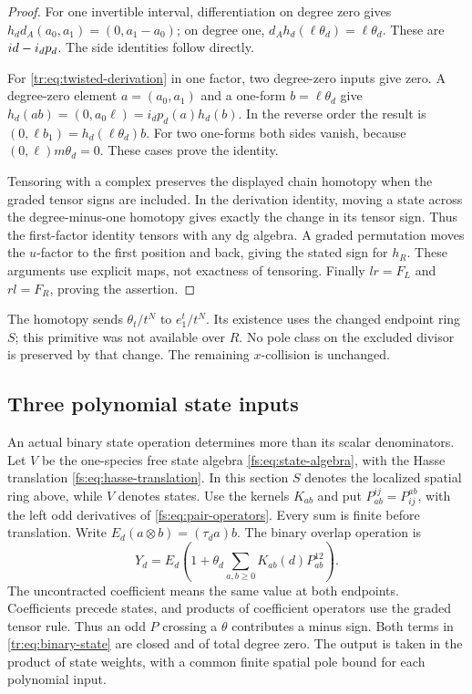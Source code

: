 \begin{proof}
For one invertible interval, differentiation on degree zero gives
\(h_dd_A(a_0,a_1)=(0,a_1-a_0)\); on degree one,
\(d_Ah_d(\ell\theta_d)=\ell\theta_d\).  These are
\(id-i_dp_d\).  The side identities follow directly.

For \eqref{tr:eq:twisted-derivation} in one factor, two degree-zero
inputs give zero.  A degree-zero element \(a=(a_0,a_1)\)
and a one-form \(b=\ell\theta_d\) give
\(h_d(ab)=(0,a_0\ell)=i_dp_d(a)h_d(b)\).
In the reverse order the result is
\((0,\ell b_1)=h_d(\ell\theta_d)b\).
For two one-forms both sides vanish, because
\((0,\ell)m\theta_d=0\).  These cases prove the identity.

Tensoring with a complex preserves the displayed chain homotopy
when the graded tensor signs are included.  In the derivation
identity, moving a state across the degree-minus-one homotopy gives
exactly the change in its tensor sign.  Thus the first-factor
identity tensors with any dg algebra.  A graded permutation moves
the \(u\)-factor to the first position and back, giving the
stated sign for \(h_R\).  These arguments use explicit maps,
not exactness of tensoring.  Finally \(lr=F_L\) and
\(rl=F_R\), proving the assertion.
\end{proof}

The homotopy sends \(\theta_t/t^N\) to
\(e_1^t/t^N\).  Its existence uses the changed endpoint ring
\(S\); this primitive was not available over \(R\).
No pole class on the excluded divisor is preserved by that change.
The remaining \(x\)-collision is unchanged.

\subsection{Three polynomial state inputs}

An actual binary state operation determines more than its scalar
denominators.  Let \(V\) be the one-species free state algebra
\eqref{fs:eq:state-algebra}, with the Hasse translation
\eqref{fs:eq:hasse-translation}.  In this section \(S\) denotes the
localized spatial ring above, while \(V\) denotes states.
Use the kernels \(K_{ab}\) and put
\(P_{ab}^{ij}=P_{ij}^{ab}\), with the left odd derivatives of
\eqref{fs:eq:pair-operators}.  Every sum is finite before translation.
Write
\(E_d(a\otimes b)=(\tau_da)b\).  The binary overlap operation is
\begin{equation}\label{tr:eq:binary-state}
 Y_d=E_d\left(1+\theta_d\sum_{a,b\ge0}K_{ab}(d)P_{ab}^{12}\right).
\end{equation}
The uncontracted coefficient means the same value at both endpoints.
Coefficients precede states, and products of coefficient operators
use the graded tensor rule.  Thus an odd \(P\) crossing a
\(\theta\) contributes a minus sign.
Both terms in \eqref{tr:eq:binary-state} are closed and of total
degree zero.  The output is taken in the product of state weights,
with a common finite spatial pole bound for each polynomial input.

